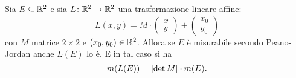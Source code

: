 \begin{theorem}
\label{th:area_lineare}%
%
%
Sia $E\subseteq {\mathbb R}^2$ e sia $L\colon {\mathbb R}^2\to{\mathbb R}^2$ una trasformazione
lineare affine:
\[
  L(x,y) = M\cdot \begin{pmatrix}
    x \\ y
  \end{pmatrix}
  + \begin{pmatrix}
    x_0 \\ y_0
  \end{pmatrix}
\]
con $M$ matrice $2\times 2$ e $(x_0 ,y_0)\in {\mathbb R}^2$.
Allora se $E$ è misurabile secondo Peano-Jordan anche $L(E)$ lo è.
E in tal caso si ha
\begin{equation}\label{eq:formula_area}
  m(L(E)) = {\left|\det M\right|} \cdot m(E).
\end{equation}
\end{theorem}
%
